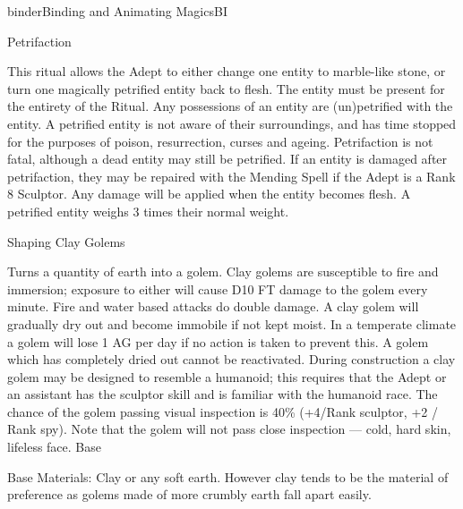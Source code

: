 \begin{college}[1.1]{binder}{Binding and Animating Magics}{BI}
\begin{ritual}[Q-2]{Petrifaction}
\begin{effects}
This ritual allows the Adept to either change one entity to
marble-like stone, or turn one magically petrified entity back to
flesh. The entity must be present for the entirety of the Ritual. Any
possessions of an entity are (un)petrified with the entity. A
petrified entity is not aware of their surroundings, and has time
stopped for the purposes of poison, resurrection, curses and
ageing. Petrifaction is not fatal, although a dead entity may still be
petrified. If an entity is damaged after petrifaction, they may be
repaired with the Mending Spell if the Adept is a Rank 8 Sculptor. Any
damage will be applied when the entity becomes flesh. A petrified
entity weighs 3 times their normal weight.
\end{effects}
\end{ritual}

\begin{ritual}[Q-3]{Shaping Clay Golems}

\materialcost{100 sp}
\begin{effects}
Turns a quantity of earth into a golem.  Clay golems are susceptible
to fire and immersion; exposure to either will cause D10 FT damage to
the golem every minute. Fire and water based attacks do double damage.
A clay golem will gradually dry out and become immobile if not kept
moist.  In a temperate climate a golem will lose 1 AG per day if no
action is taken to prevent this.  A golem which has completely dried
out cannot be reactivated.  During construction a clay golem may be
designed to resemble a humanoid; this requires that the Adept or an
assistant has the sculptor skill and is familiar with the humanoid
race.  The chance of the golem passing visual inspection is 40\%
(+4/Rank sculptor, +2 / Rank spy).  Note that the golem will not pass
close inspection --- cold, hard skin, lifeless face.  Base

Base Materials: Clay or any soft earth. However clay tends to be the
material of preference as golems made of more crumbly earth fall apart
easily.
\end{effects}
\end{ritual}


\end{college}

